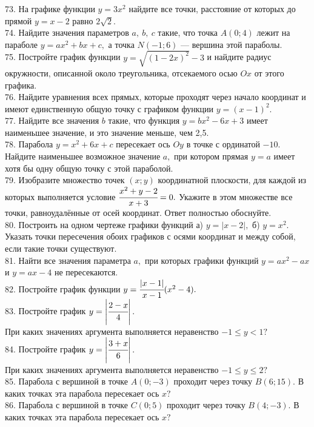 73. На графике функции $y=3x^2$ найдите все точки, расстояние от которых до прямой $y=x-2$ равно $2\sqrt{2}.$\\
74. Найдите значения параметров $a,\ b,\ c$ такие, что точка $A(0;4)$ лежит на параболе $y=ax^2+bx+c,$ а точка $N(-1;6)$ --- вершина этой параболы.\\
75. Постройте график функции $y=\sqrt{(1-2x)^2}-3$ и найдите радиус окружности, описанной около треугольника, отсекаемого осью $Ox$ от этого графика.\\
76. Найдите уравнения всех прямых, которые проходят через начало координат и имеют единственную общую точку с графиком функции $y=(x-1)^2.$\\
77. Найдите все значения $b$ такие, что функция $y=bx^2-6x+3$ имеет наименьшее значение, и это значение меньше, чем 2,5.\\
78. Парабола $y=x^2+6x+c$ пересекает ось $Oy$ в точке с ординатой $-10.$ Найдите наименьшее возможное значение $a,$ при котором прямая $y=a$ имеет хотя бы одну общую точку с этой параболой.\\
79. Изобразите множество точек $(x;y)$ координатной плоскости, для каждой из которых выполняется условие $\cfrac{x^2+y-2}{x+3}=0.$ Укажите в этом множестве все точки, равноудалённые от осей координат. Ответ полностью обоснуйте.\\
80. Построить на одном чертеже графики функций а) $y=|x-2|,$ б) $y=x^2.$\\
Указать точки пересечения обоих графиков с осями координат и между собой, если такие точки существуют.\\
81. Найти все значения параметра $a,$ при которых графики функций $y=ax^2-ax$ и $y=ax-4$ не пересекаются.\\
82. Постройте график функции $y=\cfrac{|x-1|}{x-1}(x^2-4).$\\
83. Постройте график $y=\left|\cfrac{2-x}{4}\right|.$\\
При каких значениях аргумента выполняется неравенство $-1\leqslant y<1?$\\
84. Постройте график $y=\left|\cfrac{3+x}{6}\right|.$\\
При каких значениях аргумента выполняется неравенство $-1\leqslant y\leqslant2?$\\
85. Парабола с вершиной в точке $A(0;-3)$ проходит через точку $B(6;15).$ В каких точках эта парабола пересекает ось $x?$\\
86. Парабола с вершиной в точке $C(0;5)$ проходит через точку $B(4;-3).$ В каких точках эта парабола пересекает ось $x?$\\
